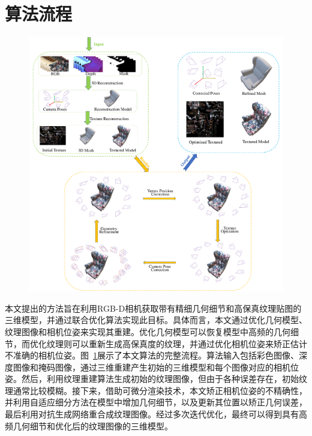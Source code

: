 \section{算法流程}
\begin{figure}[!t]
    \centering
    \includegraphics[width=1\columnwidth]{pic/work2/work2.pdf}
    \label{fig:work2}
\end{figure}

本文提出的方法旨在利用RGB-D相机获取带有精细几何细节和高保真纹理贴图的三维模型，并通过联合优化算法实现此目标。具体而言，本文通过优化几何模型、纹理图像和相机位姿来实现其重建。优化几何模型可以恢复模型中高频的几何细节，而优化纹理则可以重新生成高保真度的纹理，并通过优化相机位姿来矫正估计不准确的相机位姿。图~\ref{fig:work2}展示了本文算法的完整流程。算法输入包括彩色图像、深度图像和掩码图像，通过三维重建产生初始的三维模型和每个图像对应的相机位姿。然后，利用纹理重建算法生成初始的纹理图像，但由于各种误差存在，初始纹理通常比较模糊。接下来，借助可微分渲染技术，本文矫正相机位姿的不精确性，并利用自适应细分方法在模型中增加几何细节，以及更新其位置以矫正几何误差，最后利用对抗生成网络重合成纹理图像。经过多次迭代优化，最终可以得到具有高频几何细节和优化后的纹理图像的三维模型。\par

